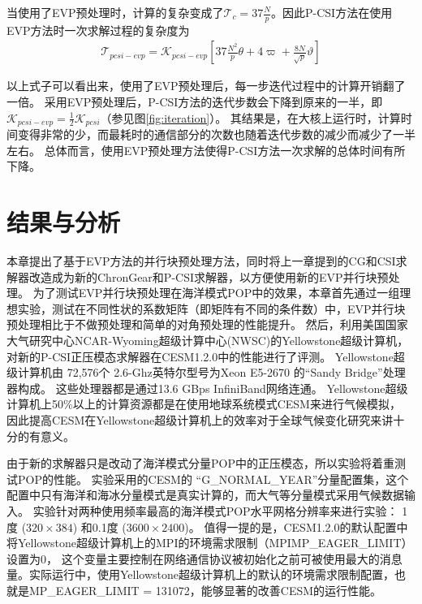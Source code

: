 当使用了EVP预处理时，计算的复杂变成了$\mathcal{T}_c = 37 \frac{N}{p}$。因此P-CSI方法在使用EVP方法时一次求解过程的复杂度为
\begin{eqnarray}
\label{t_pcsiEvp}
\mathcal{T}_{pcsi-evp}=\mathcal{K}_{pcsi-evp}[37\frac{N^2}{p}\theta+ 4\varpi + \frac{8N}{ \sqrt{p}}\vartheta]
\end{eqnarray}

以上式子可以看出来，使用了EVP预处理后，每一步迭代过程中的计算开销翻了一倍。
采用EVP预处理后，P-CSI方法的迭代步数会下降到原来的一半，即$\mathcal{K}_{pcsi-evp} = \frac{1}{2}\mathcal{K}_{pcsi}$（参见图\ref{fig:iteration}）。
其结果是，在大核上运行时，计算时间变得非常的少，而最耗时的通信部分的次数也随着迭代步数的减少而减少了一半左右。
总体而言，使用EVP预处理方法使得P-CSI方法一次求解的总体时间有所下降。 


\section{结果与分析}
\label{precond:exp}


本章提出了基于EVP方法的并行块预处理方法，同时将上一章提到的CG和CSI求解器改造成为新的ChronGear和P-CSI求解器，以方便使用新的EVP并行块预处理。
为了测试EVP并行块预处理在海洋模式POP中的效果，本章首先通过一组理想实验，测试在不同性状的系数矩阵（即矩阵有不同的条件数）中，EVP并行块预处理相比于不做预处理和简单的对角预处理的性能提升。
然后，利用美国国家大气研究中心NCAR-Wyoming超级计算中心(NWSC)\cite{loft:2015}的Yellowstone超级计算机，对新的P-CSI正压模态求解器在CESM1.2.0中的性能进行了评测。 
Yellowstone超级计算机由 72,576个
2.6-Ghz英特尔型号为Xeon E5-2670 的“Sandy Bridge”处理器构成。 
这些处理器都是通过13.6 GBps InfiniBand网络连通。   
Yellowstone超级计算机上50\%以上的计算资源都是在使用地球系统模式CESM来进行气候模拟， 
因此提高CESM在Yellowstone超级计算机上的效率对于全球气候变化研究来讲十分的有意义\cite{wf2014}。 


由于新的求解器只是改动了海洋模式分量POP中的正压模态，所以实验将着重测试POP的性能。 
实验采用的CESM的
“G\_NORMAL\_YEAR”分量配置集，这个配置中只有海洋和海冰分量模式是真实计算的，而大气等分量模式采用气候数据输入。
实验针对两种使用频率最高的海洋模式POP水平网格分辨率来进行实验：
1度 ($320\times 384$) 和0.1度 ($3600\times 2400$)。
值得一提的是，CESM1.2.0的默认配置中将Yellowstone超级计算机上的MPI的环境需求限制（MPIMP\_EAGER\_LIMIT）设置为0， 这个变量主要控制在网络通信协议被初始化之前可被使用最大的消息量。实际运行中，使用Yellowstone超级计算机上的默认的环境需求限制配置，也就是MP\_EAGER\_LIMIT = 131072，能够显著的改善CESM的运行性能。 

